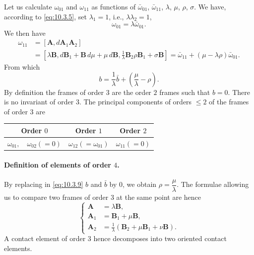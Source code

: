 Let us calculate $\omega_{01}$ and $\omega_{11}$ as functions of $\bar\omega_{01}$, $\bar\omega_{11}$, $\lambda$, $\mu$, $\rho$, $\sigma$. We have, according to \eqref{eq:10.3.5}, set $\lambda_{1}=1$, i.e., $\lambda\lambda_{2}=1$,
\begin{equation}
  \label{eq:10.3.8}
  \omega_{01}=\lambda\bar\omega_{01}.
\end{equation}
We then have
\begin{align*}
  \omega_{11}&=[\mathbf{A},d\mathbf{A}_{1}\mathbf{A}_{2}]\\
  &=\left[\lambda\mathbf{B},d\mathbf{B}_{1}+\mathbf{B}\,d\mu+\mu\,d\mathbf{B},\frac{1}{\lambda}\mathbf{B}_{2}\rho\mathbf{B}_{1}+\sigma\mathbf{B}\right]=\bar\omega_{11}+(\mu-\lambda\rho)\bar\omega_{01}.
\end{align*}
From which
\begin{equation}
  \label{eq:10.3.9}
  b=\frac{1}{\lambda}\bar b+\left(\frac{\mu}{\lambda}-\rho\right).
\end{equation}
By definition the frames of order $3$ are the order $2$ frames such that $b=0$. There is no invariant of order $3$. The principal components of orders $\le 2$ of the frames of order $3$ are
\begin{center}  
  \begin{tabular}{|c|c|c|}
    \hline
    Order $0$&Order $1$&Order $2$\\
    \hline
    $\omega_{01},\quad\omega_{02}(=0)$&$\omega_{12}(=\omega_{01})$&$\omega_{11}(=0)$\\
    \hline
  \end{tabular}
\end{center}

\paragraph{Definition of elements of order $4$.}
\label{sec:145}
By replacing in \eqref{eq:10.3.9} $b$ and $\bar b$ by $0$, we obtain $\rho=\dfrac{\mu}{\lambda}$. The formulae allowing us to compare two frames of order $3$ at the same point are hence
\begin{equation}
  \label{eq:10.3.10}
  \left\{
    \begin{aligned}
      \mathbf{A}_{\phantom{0}}&=\lambda\mathbf{B},\\
      \mathbf{A}_{1}&=\mathbf{B}_{1}+\mu\mathbf{B},\\      
      \mathbf{A}_{2}&=\frac{1}{\lambda}(\mathbf{B}_{2}+\mu\mathbf{B}_{1}+\nu\mathbf{B}).      
    \end{aligned}
  \right.
\end{equation}
A contact element of order $3$ hence decomposes into two oriented contact elements.

